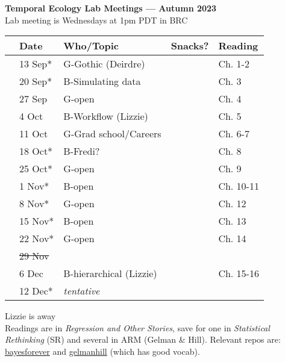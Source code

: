 \documentclass[11pt]{article}
\begin{document}
 
\raggedright
{}

\begin{center} 
{\large \textbf{Temporal Ecology Lab Meetings --- Autumn 2023}} \\ [2pt]
Lab meeting is Wednesdays at 1pm PDT in BRC\\ %
\end{center} 

\begin{center}
\begin{tabular}{ p{0.2 cm}  p{2 cm}  p{4.5 cm}  p{3 cm}  p{3.5 cm} }  \hline \hline
 & \textbf{Date}
   & \textbf{Who/Topic}
      & \textbf{Snacks?} 
         & \textbf{Reading} \\ 
\hline \hline
 &13 Sep* & G-Gothic (Deirdre)  &       & Ch. 1-2 \\\hline
 & 20 Sep* & B-Simulating data & & Ch. 3 \\\hline
 & 27 Sep & G-open &  & Ch. 4 \\\hline  
 & 4 Oct &  B-Workflow (Lizzie)   &  &  Ch. 5 \\\hline
 & 11 Oct  & G-Grad school/Careers  & &  Ch. 6-7 \\\hline 
 & 18 Oct* & B-Fredi? & & Ch. 8  \\\hline
 & 25 Oct*  & G-open &  & Ch. 9\\\hline
 & 1 Nov* &  B-open  & & Ch. 10-11  \\\hline 
  & 8 Nov*  &  G-open  &  &  Ch. 12 \\\hline
 & 15 Nov*  &  B-open  &  &  Ch. 13\\\hline
  & 22 Nov*  &  G-open  &  & Ch. 14 \\\hline
 & \sout{29 Nov}  &    &  &  \\\hline
 & 6 Dec  & B-hierarchical (Lizzie)    &  & Ch. 15-16 \\\hline
 & 12 Dec*  &  \emph{tentative}    &  & \\\hline
\hline
\end{tabular}
\end{center}
\noindent *Lizzie is away \\
Readings are in \emph{Regression and Other Stories}, save for one in \emph{Statistical Rethinking} (SR) and several in ARM (Gelman \& Hill). Relevant repos are: \href{https://github.com/temporalecologylab/bayesforever}{bayesforever} and \href{https://github.com/lizzieinvancouver/gelmanhill}{gelmanhill} (which has good vocab). \\
\end{document}
